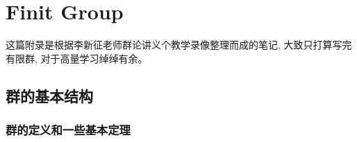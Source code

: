 
\chapter{Finit Group}
这篇附录是根据李新征老师群论讲义个教学录像整理而成的笔记, 大致只打算写完有限群, 对于高量学习绰绰有余。
\section{群的基本结构}
\subsection{群的定义和一些基本定理}